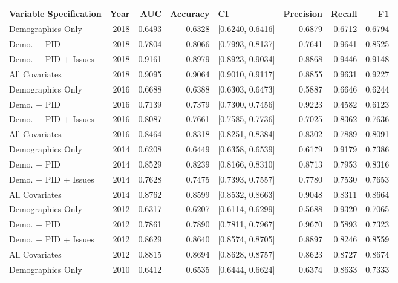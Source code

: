 \begin{table}[ht]
\centering
\begin{tabular}{lrrrlrrr}
  \toprule
Variable Specification & Year & AUC & Accuracy & CI & Precision & Recall & F1 \\ 
  \midrule
Demographics Only & 2018 & 0.6493 & 0.6328 & [0.6240, 0.6416] & 0.6879 & 0.6712 & 0.6794 \\ 
  Demo. + PID & 2018 & 0.7804 & 0.8066 & [0.7993, 0.8137] & 0.7641 & 0.9641 & 0.8525 \\ 
  Demo. + PID + Issues & 2018 & 0.9161 & 0.8979 & [0.8923, 0.9034] & 0.8868 & 0.9446 & 0.9148 \\ 
  All Covariates & 2018 & 0.9095 & 0.9064 & [0.9010, 0.9117] & 0.8855 & 0.9631 & 0.9227 \\ 
  Demographics Only & 2016 & 0.6688 & 0.6388 & [0.6303, 0.6473] & 0.5887 & 0.6646 & 0.6244 \\ 
  Demo. + PID & 2016 & 0.7139 & 0.7379 & [0.7300, 0.7456] & 0.9223 & 0.4582 & 0.6123 \\ 
  Demo. + PID + Issues & 2016 & 0.8087 & 0.7661 & [0.7585, 0.7736] & 0.7025 & 0.8362 & 0.7636 \\ 
  All Covariates & 2016 & 0.8464 & 0.8318 & [0.8251, 0.8384] & 0.8302 & 0.7889 & 0.8091 \\ 
  Demographics Only & 2014 & 0.6208 & 0.6449 & [0.6358, 0.6539] & 0.6179 & 0.9179 & 0.7386 \\ 
  Demo. + PID & 2014 & 0.8529 & 0.8239 & [0.8166, 0.8310] & 0.8713 & 0.7953 & 0.8316 \\ 
  Demo. + PID + Issues & 2014 & 0.7628 & 0.7475 & [0.7393, 0.7557] & 0.7780 & 0.7530 & 0.7653 \\ 
  All Covariates & 2014 & 0.8762 & 0.8599 & [0.8532, 0.8663] & 0.9048 & 0.8311 & 0.8664 \\ 
  Demographics Only & 2012 & 0.6317 & 0.6207 & [0.6114, 0.6299] & 0.5688 & 0.9320 & 0.7065 \\ 
  Demo. + PID & 2012 & 0.7861 & 0.7890 & [0.7811, 0.7967] & 0.9670 & 0.5893 & 0.7323 \\ 
  Demo. + PID + Issues & 2012 & 0.8629 & 0.8640 & [0.8574, 0.8705] & 0.8897 & 0.8246 & 0.8559 \\ 
  All Covariates & 2012 & 0.8815 & 0.8694 & [0.8628, 0.8757] & 0.8623 & 0.8727 & 0.8674 \\ 
  Demographics Only & 2010 & 0.6412 & 0.6535 & [0.6444, 0.6624] & 0.6374 & 0.8633 & 0.7333 \\ 

\end{tabular}
\end{table}
